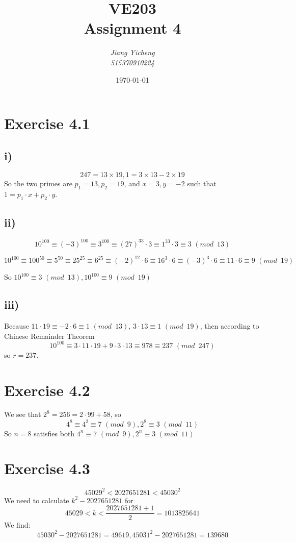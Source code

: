 \documentclass[a4paper,12pt,titlepage]{article}
\author{\textit{Jiang Yicheng}\\\textit{515370910224}}
\title{\textbf{VE203\\
		Assignment 4}}
\date{\today}
\begin{document}
\maketitle

\section*{Exercise 4.1} 
\subsection*{i)}
$$247=13\times 19,1=3\times13-2\times19$$
So the two primes are $p_1=13,p_2=19$, and $x=3,y=-2$ such that $1=p_1\cdot x+p_2\cdot y$.
\subsection*{ii)}
$$10^{100}\equiv (-3)^{100}\equiv 3^{100}\equiv(27)^{33}\cdot3\equiv1^{33}\cdot3\equiv3 \,\,(mod\,\,\,13)$$

$$10^{100}\equiv100^{50}\equiv5^{50}\equiv25^{25}\equiv6^{25}\equiv(-2)^{12}\cdot6\equiv16^{3}\cdot6\equiv(-3)^3\cdot6\equiv11\cdot6\equiv9\,\,(mod\,\,\,19)$$

So $10^{100}\equiv3 \,\,(mod\,\,\,13),10^{100}\equiv9\,\,(mod\,\,\,19)$

\subsection*{iii)}
Because $11\cdot19\equiv-2\cdot6\equiv1\,\,(mod \,\,\,13)$, $3\cdot13\equiv1\,\,(mod\,\,\,19)$, then according to Chinese Remainder Theorem
$$10^{100}\equiv3\cdot 11\cdot 19+9\cdot 3\cdot 13\equiv978\equiv237\,\,(mod\,\,\,247)$$
so $r=237.$

\section*{Exercise 4.2}

We see that $2^8=256=2\cdot99+58$, so
$$4^8\equiv4^2\equiv7\,\,(mod\,\,\,9),2^8\equiv3\,\,(mod\,\,\,11)$$
So $n=8$ satisfies both $4^n\equiv7\,\,(mod\,\,\,9),2^n\equiv3\,\,(mod\,\,\,11)$  


\section*{Exercise 4.3}
$$45029^2<2027651281<45030^2$$
We need to calculate $k^2-2027651281$ for
$$45029<k<\dfrac{2027651281+1}{2}=1013825641$$
We find:
$$45030^2-2027651281=49619,
45031^2-2027651281=139680$$ 
\end{document}

